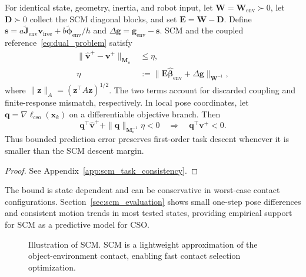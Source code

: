 \begin{lemma}
\label{lem:scm_task_consistency}
For identical state, geometry, inertia, and robot input, let $\boldsymbol{W}=\boldsymbol{W}_{\mathrm{env}}\succ0$, let $\boldsymbol{D}\succ0$ collect the SCM diagonal blocks, and set $\boldsymbol{E}=\boldsymbol{W}-\boldsymbol{D}$. Define $\boldsymbol{s}=a\boldsymbol{\tilde J}_{\mathrm{env}}\boldsymbol{v}_{\mathrm{free}}+b\boldsymbol{\tilde\phi}_{\mathrm{env}}/h$ and $\Delta\boldsymbol{g}=\boldsymbol{g}_{\mathrm{env}}-\boldsymbol{s}$. SCM and the coupled reference~\eqref{eq:dual_problem} satisfy
\begin{equation}
\begin{aligned}
\|\hat{\boldsymbol{v}}^+-\boldsymbol{v}^+\|_{\boldsymbol{M}_o}
&\leq\eta,\\
\eta&:=\|\boldsymbol{E}\hat{\boldsymbol{\beta}}_{\mathrm{env}}
+\Delta\boldsymbol{g}\|_{\boldsymbol{W}^{-1}},
\end{aligned}
\label{eq:scm_motion_error_bound}
\end{equation}
where $\|\boldsymbol{z}\|_A=(\boldsymbol{z}^{\top}A\boldsymbol{z})^{1/2}$. The two terms account for discarded coupling and finite-response mismatch, respectively. In local pose coordinates, let $\boldsymbol{q}=\nabla\ell_{\mathrm{cso}}(\boldsymbol{x}_k)$ on a differentiable objective branch. Then
\begin{equation}
\boldsymbol{q}^{\top}\hat{\boldsymbol{v}}^+
+\|\boldsymbol{q}\|_{\boldsymbol{M}_o^{-1}}\eta<0
\quad\Longrightarrow\quad
\boldsymbol{q}^{\top}\boldsymbol{v}^+<0.
\label{eq:scm_descent_condition}
\end{equation}
Thus bounded prediction error preserves first-order task descent whenever it is smaller than the SCM descent margin.
\end{lemma}
\begin{proof}
See Appendix~\ref{app:scm_task_consistency}.
\end{proof}

The bound is state dependent and can be conservative in worst-case contact configurations. Section~\ref{sec:scm_evaluation} shows small one-step pose differences and consistent motion trends in most tested states, providing empirical support for SCM as a predictive model for CSO.
\begin{figure}[!t]
 \centerline{}
\caption{Illustration of SCM. SCM is a lightweight approximation of the object-environment contact, enabling fast contact selection optimization.}
\label{fig:stick1}
\end{figure}
